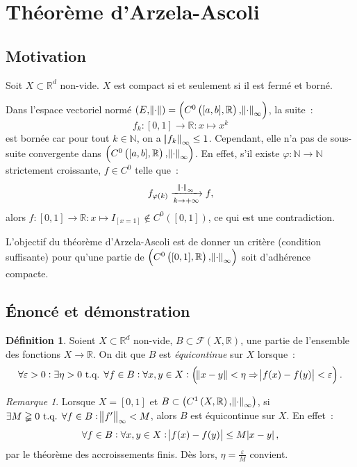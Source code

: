 \documentclass{report}
\theoremstyle{definition}
\newtheorem{déf}[thm]{Définition}
\theoremstyle{remark}
\newtheorem*{rmq}{Remarque}
\numberwithin{equation}{section}
\newcommand{\R}{\mathbb R}
\newcommand{\N}{\mathbb N}
\newcommand{\tq}{\text{ t.q. }}
\newcommand{\evfn}[3]{\left(#1\left(#2, #3\right), \norm {\cdot}_{\infty}\right)}
\newcommand{\evnC}[3]{{\evfn {C^{#1}}{#2}{#3}}}
\newcommand{\pinfty}{{+\infty}}
\newcommand{\evn}{espace vectoriel normé }
\begin{document}
	\section{Théorème d'Arzela-Ascoli}
		\subsection{Motivation}
			Soit $X \subset \R^d$ non-vide. $X$ est compact si et seulement si il est fermé et borné.

			Dans l'\evn $(E, \norm \cdot) = \evnC0{[a, b]}\R$, la suite~:
			\begin{equation}
				f_k : [0, 1] \to \R : x \mapsto x^k
			\end{equation}
			est bornée car pour tout $k \in \N$, on a $\norm {f_k}_\infty \leq 1$. Cependant, elle n'a pas de sous-suite convergente dans $\evnC0{[a, b]}\R$.
			En effet, s'il existe $\varphi : \N \to \N$ strictement croissante, $f \in C^0$ telle que~:
			\begin{equation}
				f_{\varphi(k)} \xrightarrow[k \to \pinfty]{\norm \cdot_\infty} f,
			\end{equation}
			alors $f : [0, 1] \to \R : x \mapsto I_{[x=1]} \not \in C^0([0, 1])$, ce qui est une contradiction.

			L'objectif du théorème d'Arzela-Ascoli est de donner un critère (condition suffisante) pour qu'une partie de $\evnC {0}{[0, 1]}{\R}$ soit d'adhérence
			compacte.

		\subsection{Énoncé et démonstration}
			\begin{déf} Soient $X \subset \R^d$ non-vide, $B \subset \mathcal F(X, \R)$, une partie de l'ensemble des fonctions $X \to \R$. On dit que $B$ est
			\textit{équicontinue} sur $X$ lorsque~:
			\begin{equation}
				\forall \varepsilon > 0 : \exists \eta > 0 \tq \forall f \in B : \forall x, y \in X :
				\left(\norm {x-y} < \eta \Rightarrow \abs {f(x)-f(y)} < \varepsilon\right).
			\end{equation}
			\end{déf}

			\begin{rmq} Lorsque $X = [0, 1]$ et $B \subset \evnC1X\R$, si $\exists M \gneqq 0 \tq \forall f \in B : \norm {f'}_\infty < M$, alors $B$ est
			équicontinue sur $X$. En effet~:
			\begin{equation}
				\forall f \in B : \forall x, y \in X : \abs {f(x)-f(y)} \leq M\abs {x-y},
			\end{equation}
			par le théorème des accroissements finis. Dès lors, $\eta = \frac \varepsilon M$ convient.
			\end{rmq}
\end{document}
